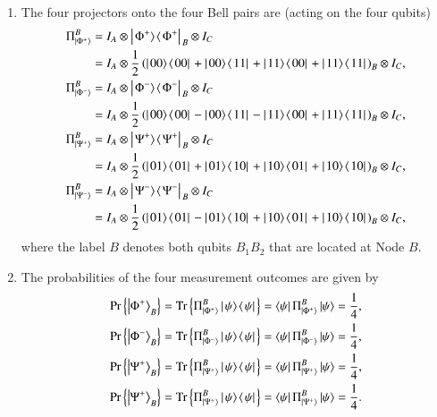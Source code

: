 \begin{solution}
\begin{enumerate}[label=(\alph*)]
    \item The four projectors onto the four Bell pairs are (acting on the four qubits)
    \begin{align*}
        \Pi^{B}_{\ket{\Phi^+}} & = I_A \otimes \outp{\Phi^+}{\Phi^+}_B \otimes I_C \\
        & = I_A \otimes \frac{1}{2}\left( \outp{00}{00} + \outp{00}{11} + \outp{11}{00} + \outp{11}{11} \right)_B \otimes I_C, \\
        \Pi^B_{\ket{\Phi^-}} & = I_A \otimes \outp{\Phi^-}{\Phi^-}_B \otimes I_C \\
        & = I_A \otimes \frac{1}{2}\left( \outp{00}{00} - \outp{00}{11} - \outp{11}{00} + \outp{11}{11} \right)_B \otimes I_C, \\
        \Pi^B_{\ket{\Psi^+}} & = I_A \otimes \outp{\Psi^+}{\Psi^+}_B \otimes I_C \\
        & = I_A \otimes \frac{1}{2}\left( \outp{01}{01} + \outp{01}{10} + \outp{10}{01} + \outp{10}{10} \right)_B \otimes I_C, \\
        \Pi^B_{\ket{\Psi^-}} & = I_A \otimes \outp{\Psi^-}{\Psi^-}_B \otimes I_C \\
        & = I_A \otimes \frac{1}{2}\left( \outp{01}{01} - \outp{01}{10} + \outp{10}{01} + \outp{10}{10} \right)_B \otimes I_C,
    \end{align*}
    where the label $B$ denotes both qubits $B_1B_2$ that are located at Node $B$.
    \item The probabilities of the four measurement outcomes are given by
    \begin{align*}
        \text{Pr}\left\{\left| \Phi^+ \right\rangle_B\right\} & = \text{Tr}\left\{ \Pi^B_{\left| \Phi^+ \right\rangle} \left|\left. \psi \rangle\right.\!\langle\left. \psi \right|\right.  \right\} = \left\langle \psi \right| \Pi^B_{\left| \Phi^+ \right\rangle} \left| \psi \right\rangle = \frac{1}{4}, \\
        \text{Pr}\left\{\left| \Phi^- \right\rangle_B\right\} & = \text{Tr}\left\{ \Pi^B_{\left| \Phi^- \right\rangle} \left|\left. \psi \rangle\right.\!\langle\left. \psi \right|\right.  \right\} = \left\langle \psi \right| \Pi^B_{\left| \Phi^- \right\rangle} \left| \psi \right\rangle = \frac{1}{4}, \\
        \text{Pr}\left\{\left| \Psi^+ \right\rangle_B\right\} & = \text{Tr}\left\{ \Pi^B_{\left| \Psi^+ \right\rangle} \left|\left. \psi \rangle\right.\!\langle\left. \psi \right|\right.  \right\} = \left\langle \psi \right| \Pi^B_{\left| \Psi^+ \right\rangle} \left| \psi \right\rangle = \frac{1}{4}, \\
        \text{Pr}\left\{\left| \Psi^+ \right\rangle_B\right\} & = \text{Tr}\left\{ \Pi^B_{\left| \Psi^+ \right\rangle} \left|\left. \psi \rangle\right.\!\langle\left. \psi \right|\right.  \right\} = \left\langle \psi \right| \Pi^B_{\left| \Psi^+ \right\rangle} \left| \psi \right\rangle = \frac{1}{4}.
    \end{align*}

\end{enumerate}
\end{solution}
